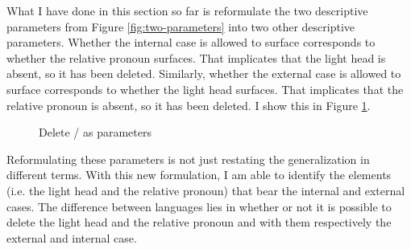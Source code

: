 What I have done in this section so far is reformulate the two descriptive parameters from Figure \ref{fig:two-parameters} into two other descriptive parameters.
Whether the internal case is allowed to surface corresponds to whether the relative pronoun surfaces. That implicates that the light head is absent, so it has been deleted.
Similarly, whether the external case is allowed to surface corresponds to whether the light head surfaces. That implicates that the relative pronoun is absent, so it has been deleted.
I show this in Figure \ref{fig:two-parameters-different}.

\begin{figure}[H]
  \centering
    \footnotesize{
    }
    \caption{Delete / as parameters}
    \label{fig:two-parameters-different}
\end{figure}

Reformulating these parameters is not just restating the generalization in different terms. With this new formulation, I am able to identify the elements (i.e. the light head and the relative pronoun) that bear the internal and external cases. The difference between languages lies in whether or not it is possible to delete the light head and the relative pronoun and with them respectively the external and internal case.

